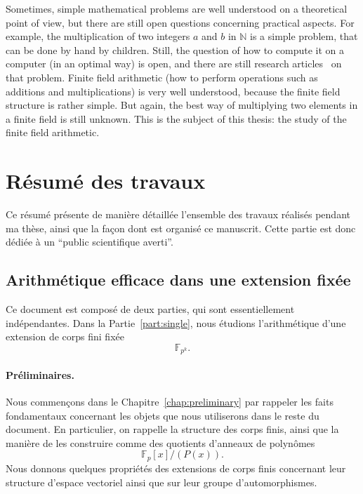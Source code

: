 Sometimes, simple mathematical problems are well understood on a theoretical
point of view, but there are still open questions concerning practical aspects.
For example, the multiplication of two integers $a$ and $b$ in $\mathbb{N}$ is a
simple problem, that can be done by hand by children. Still, the question of how
to compute it on a computer (in an optimal way) is open, and there are still
research articles~\cite{HVDH19} on that problem.
Finite field arithmetic (\ie how to perform operations such as additions and
multiplications) is very well understood, because the finite field structure is
rather simple. But again, the best way of multiplying two elements in a finite
field is still unknown. This is the subject of this thesis: the study of the
finite field arithmetic.

\section*{Résumé des travaux}

Ce résumé présente de manière détaillée l'ensemble des travaux réalisés pendant
ma thèse, ainsi que la façon dont est organisé ce manuscrit. Cette partie est
donc dédiée à un ``public scientifique averti''.

\subsection*{Arithmétique efficace dans une extension fixée}

Ce document est composé de deux parties, qui sont essentiellement indépendantes.
Dans la Partie~\ref{part:single}, nous étudions l'arithmétique d'une extension
de corps fini fixée
\[
  \mathbb{F}_{p^{k}}.
\]
\paragraph{Préliminaires.} Nous commençons dans le
Chapitre~\ref{chap:preliminary} par rappeler les faits fondamentaux concernant
les objets que nous utiliserons dans le reste du document. En particulier, on
rappelle la structure des corps finis, ainsi que la manière de les construire
comme des quotients d'anneaux de polynômes
\[
  \mathbb{F}_p[x]/(P(x)).
\]
Nous donnons quelques propriétés des extensions de corps finis concernant leur
structure d'espace vectoriel ainsi que sur leur groupe d'automorphismes.

